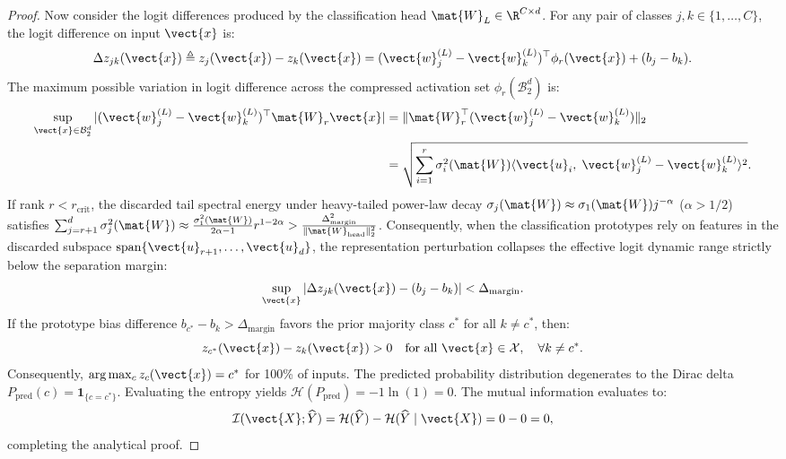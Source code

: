 \begin{proof}
Now consider the logit differences produced by the classification head $\mat{W}_L \in \R^{C \times d}$. For any pair of classes $j, k \in \{1, \dots, C\}$, the logit difference on input $\vect{x}$ is:
\begin{equation}
\Delta z_{jk}(\vect{x}) \triangleq z_j(\vect{x}) - z_k(\vect{x}) = (\vect{w}_j^{(L)} - \vect{w}_k^{(L)})^\top \phi_r(\vect{x}) + (b_j - b_k).
\end{equation}
The maximum possible variation in logit difference across the compressed activation set $\phi_r(\mathcal{B}_2^d)$ is:
\begin{align}
\sup_{\vect{x} \in \mathcal{B}_2^d} | (\vect{w}_j^{(L)} - \vect{w}_k^{(L)})^\top \mat{W}_r \vect{x} | &= \| \mat{W}_r^\top (\vect{w}_j^{(L)} - \vect{w}_k^{(L)}) \|_2 \nonumber \\
&= \sqrt{\sum_{i=1}^r \sigma_i^2(\mat{W}) \langle \vect{u}_i, \; \vect{w}_j^{(L)} - \vect{w}_k^{(L)} \rangle^2}.
\end{align}
If rank $r < r_{\text{crit}}$, the discarded tail spectral energy under heavy-tailed power-law decay $\sigma_j(\mat{W}) \approx \sigma_1(\mat{W}) j^{-\alpha}$ ($\alpha > 1/2$) satisfies $\sum_{j=r+1}^d \sigma_j^2(\mat{W}) \approx \frac{\sigma_1^2(\mat{W})}{2\alpha - 1} r^{1 - 2\alpha} > \frac{\Delta_{\text{margin}}^2}{\|\mat{W}_{\text{head}}\|_2^2}$. Consequently, when the classification prototypes rely on features in the discarded subspace $\operatorname{span}\{\vect{u}_{r+1}, \dots, \vect{u}_d\}$, the representation perturbation collapses the effective logit dynamic range strictly below the separation margin:
\begin{equation}
\sup_{\vect{x}} | \Delta z_{jk}(\vect{x}) - (b_j - b_k) | < \Delta_{\text{margin}}.
\end{equation}
If the prototype bias difference $b_{c^*} - b_k > \Delta_{\text{margin}}$ favors the prior majority class $c^*$ for all $k \neq c^*$, then:
\begin{equation}
z_{c^*}(\vect{x}) - z_k(\vect{x}) > 0 \quad \text{for all } \vect{x} \in \mathcal{X}, \quad \forall k \neq c^*.
\end{equation}
Consequently, $\arg\max_c z_c(\vect{x}) = c^*$ for 100\% of inputs. The predicted probability distribution degenerates to the Dirac delta $P_{\text{pred}}(c) = \mathbf{1}_{\{c = c^*\}}$. Evaluating the entropy yields $\mathcal{H}(P_{\text{pred}}) = - 1 \ln(1) = 0$. The mutual information evaluates to:
\begin{equation}
\mathcal{I}(\vect{X}; \widehat{Y}) = \mathcal{H}(\widehat{Y}) - \mathcal{H}(\widehat{Y} \mid \vect{X}) = 0 - 0 = 0,
\end{equation}
completing the analytical proof.
\end{proof}

